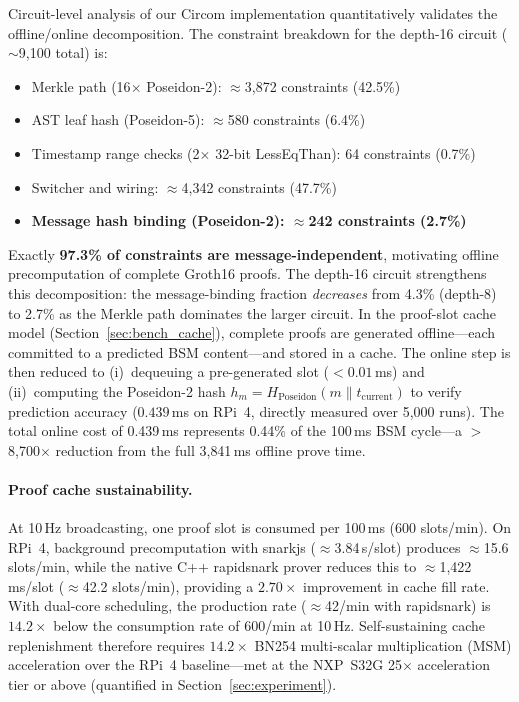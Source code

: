 Circuit-level analysis of our Circom implementation quantitatively validates the
offline/online decomposition. The constraint breakdown for the depth-16 circuit
($\sim$9{,}100 total) is:

\begin{itemize}
    \item Merkle path (16$\times$ Poseidon-2): $\approx$3{,}872 constraints (42.5\%)
    \item AST leaf hash (Poseidon-5): $\approx$580 constraints (6.4\%)
    \item Timestamp range checks (2$\times$ 32-bit LessEqThan): 64 constraints (0.7\%)
    \item Switcher and wiring: $\approx$4{,}342 constraints (47.7\%)
    \item \textbf{Message hash binding (Poseidon-2): $\approx$242 constraints (2.7\%)}
\end{itemize}

Exactly \textbf{97.3\% of constraints are message-independent}, motivating offline
precomputation of complete Groth16 proofs. The depth-16 circuit strengthens this
decomposition: the message-binding fraction \emph{decreases} from 4.3\% (depth-8)
to 2.7\% as the Merkle path dominates the larger circuit. In the proof-slot cache
model (Section~\ref{sec:bench_cache}), complete proofs are generated offline---each
committed to a predicted BSM content---and stored in a cache. The online step is
then reduced to (i)~dequeuing a pre-generated slot ($< 0.01$\,ms) and (ii)~computing
the Poseidon-2 hash $h_m = H_{\text{Poseidon}}(m \| t_{\text{current}})$ to verify
prediction accuracy ($\mathbf{0.439}$\,ms on RPi~4, directly measured over
5{,}000 runs). The total online cost of 0.439\,ms represents 0.44\% of the 100\,ms
BSM cycle---a $>$8{,}700$\times$ reduction from the full 3{,}841\,ms offline prove
time.

\paragraph{Proof cache sustainability.}
At 10\,Hz broadcasting, one proof slot is consumed per 100\,ms (600 slots/min).
On RPi~4, background precomputation with snarkjs ($\approx$3.84\,s/slot) produces
$\approx$15.6 slots/min, while the native C++ rapidsnark prover reduces this to
$\approx$1{,}422\,ms/slot ($\approx$42.2 slots/min), providing a $2.70\times$
improvement in cache fill rate. With dual-core scheduling, the production rate
($\approx$42/min with rapidsnark) is $14.2\times$ below the consumption rate of
600/min at 10\,Hz. Self-sustaining cache replenishment therefore requires
$14.2\times$ BN254 multi-scalar multiplication (MSM) acceleration over the
RPi~4 baseline---met at the NXP~S32G 25$\times$ acceleration tier or above
(quantified in Section~\ref{sec:experiment}).

